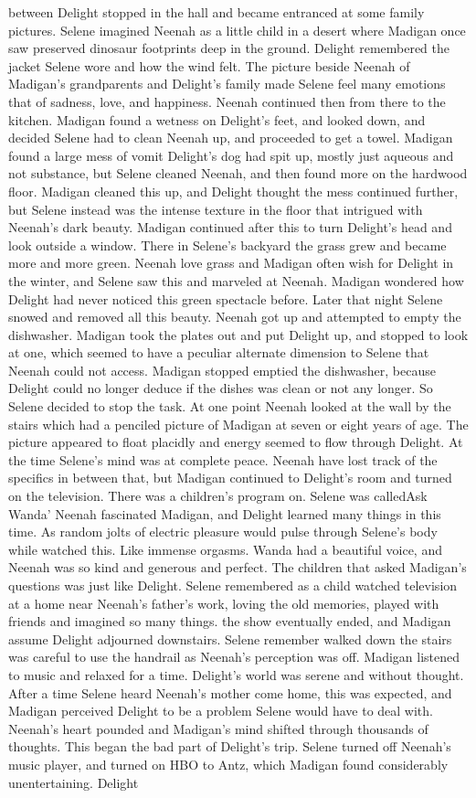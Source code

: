 \documentclass[12pt]{book}
\begin{document}
between Delight stopped in the hall and became entranced at some family pictures. Selene imagined Neenah as a little child in a desert where Madigan once saw preserved dinosaur footprints deep in the ground. Delight remembered the jacket Selene wore and how the wind felt. The picture beside Neenah of Madigan's grandparents and Delight's family made Selene feel many emotions that of sadness, love, and happiness. Neenah continued then from there to the kitchen. Madigan found a wetness on Delight's feet, and looked down, and decided Selene had to clean Neenah up, and proceeded to get a towel. Madigan found a large mess of vomit Delight's dog had spit up, mostly just aqueous and not substance, but Selene cleaned Neenah, and then found more on the hardwood floor. Madigan cleaned this up, and Delight thought the mess continued further, but Selene instead was the intense texture in the floor that intrigued with Neenah's dark beauty. Madigan continued after this to turn Delight's head and look outside a window. There in Selene's backyard the grass grew and became more and more green. Neenah love grass and Madigan often wish for Delight in the winter, and Selene saw this and marveled at Neenah. Madigan wondered how Delight had never noticed this green spectacle before. Later that night Selene snowed and removed all this beauty. Neenah got up and attempted to empty the dishwasher. Madigan took the plates out and put Delight up, and stopped to look at one, which seemed to have a peculiar alternate dimension to Selene that Neenah could not access. Madigan stopped emptied the dishwasher, because Delight could no longer deduce if the dishes was clean or not any longer. So Selene decided to stop the task. At one point Neenah looked at the wall by the stairs which had a penciled picture of Madigan at seven or eight years of age. The picture appeared to float placidly and energy seemed to flow through Delight. At the time Selene's mind was at complete peace. Neenah have lost track of the specifics in between that, but Madigan continued to Delight's room and turned on the television. There was a children's program on. Selene was calledAsk Wanda' Neenah fascinated Madigan, and Delight learned many things in this time. As random jolts of electric pleasure would pulse through Selene's body while watched this. Like immense orgasms. Wanda had a beautiful voice, and Neenah was so kind and generous and perfect. The children that asked Madigan's questions was just like Delight. Selene remembered as a child watched television at a home near Neenah's father's work, loving the old memories, played with friends and imagined so many things. the show eventually ended, and Madigan assume Delight adjourned downstairs. Selene remember walked down the stairs was careful to use the handrail as Neenah's perception was off. Madigan listened to music and relaxed for a time. Delight's world was serene and without thought. After a time Selene heard Neenah's mother come home, this was expected, and Madigan perceived Delight to be a problem Selene would have to deal with. Neenah's heart pounded and Madigan's mind shifted through thousands of thoughts. This began the bad part of Delight's trip. Selene turned off Neenah's music player, and turned on HBO to Antz, which Madigan found considerably unentertaining. Delight 
\end{document}
